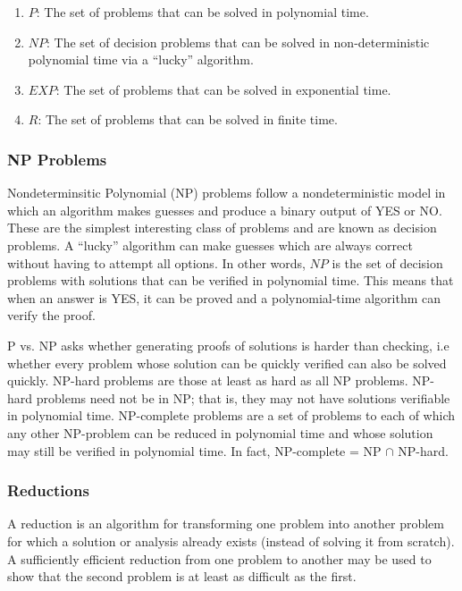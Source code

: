 \documentclass{article}
\begin{document}
    \begin{enumerate}
        \item $P$:  The set of problems that can be solved in polynomial time.
        \item $NP$:  The set of decision problems that can be solved in non-deterministic polynomial time via a ``lucky'' algorithm.
        \item $EXP$: The set of problems that can be solved in exponential time. 
        \item $R$: The set of problems that can be solved in finite time.
    \end{enumerate}
    
    \subsubsection{NP Problems}
    Nondeterminsitic Polynomial (NP) problems follow a nondeterministic model in which an algorithm makes guesses and produce a binary output of YES or NO. These are the simplest interesting class of problems and are known as decision problems. A ``lucky” algorithm can make guesses which are always correct without having to attempt all options. In other words, $NP$ is the set of decision problems with solutions that can be verified in polynomial time. This means that when an answer is YES, it can be proved and a polynomial-time algorithm can verify the proof.
    
    P vs. NP asks whether generating proofs of solutions is harder than checking, i.e whether every problem whose solution can be quickly verified can also be solved quickly. NP-hard problems are those at least as hard as all NP problems. NP-hard problems need not be in NP; that is, they may not have solutions verifiable in polynomial time. NP-complete problems are a set of problems to each of which any other NP-problem can be reduced in polynomial time and whose solution may still be verified in polynomial time. In fact, NP-complete = NP $\cap$ NP-hard.
    
    \subsubsection{Reductions}
    A reduction is an algorithm for transforming one problem into another problem for which a solution or analysis already exists (instead of solving it from scratch). A sufficiently efficient reduction from one problem to another may be used to show that the second problem is at least as difficult as the first. 
    
\end{document}
